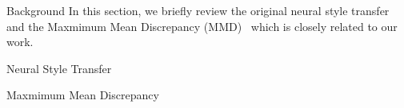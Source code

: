 \begin{section}{Background}
In this section, we briefly review the original neural style transfer~\cite{neuralart} and the Maxmimum Mean Discrepancy (MMD)~\cite{mmd} which is closely related to our work.
\begin{paragraph}{Neural Style Transfer}
\end{paragraph}

\begin{paragraph}{Maxmimum Mean Discrepancy}
\end{paragraph}
\end{section}